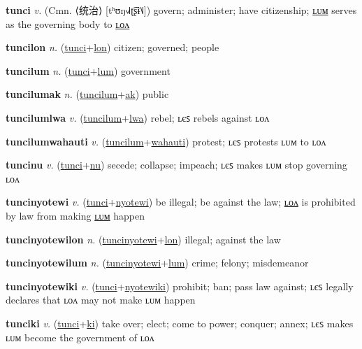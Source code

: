 \textbf{\hypertarget{tunci}{tunci}} \textit{v.} (Cmn. ⟨{\chinese{}统治}⟩ [tʰʊŋ˧˩˧ʈ͡ʂɨ˥˩])
govern; administer; have citizenship; \hyperlink{tuncilum}{ʟᴜᴍ} serves as the governing body to \hyperlink{tuncilon}{ʟᴏᴧ}

\textbf{\hypertarget{tuncilon}{tuncilon}} \textit{n.} (\hyperlink{tunci}{tunci}+\allowbreak \hyperlink{lon}{lon})
citizen; governed; people

\textbf{\hypertarget{tuncilum}{tuncilum}} \textit{n.} (\hyperlink{tunci}{tunci}+\allowbreak \hyperlink{lum}{lum})
government

\textbf{\hypertarget{tuncilumak}{tuncilumak}} \textit{n.} (\hyperlink{tuncilum}{tuncilum}+\allowbreak \hyperlink{ak}{ak})
public

\textbf{\hypertarget{tuncilumlwa}{tuncilumlwa}} \textit{v.} (\hyperlink{tuncilum}{tuncilum}+\allowbreak \hyperlink{lwa}{lwa})
rebel; ʟєꜱ rebels against ʟᴏᴧ

\textbf{\hypertarget{tuncilumwahauti}{tuncilumwahauti}} \textit{v.} (\hyperlink{tuncilum}{tuncilum}+\allowbreak \hyperlink{wahauti}{wahauti})
protest; ʟєꜱ protests ʟᴜᴍ to ʟᴏᴧ

\textbf{\hypertarget{tuncinu}{tuncinu}} \textit{v.} (\hyperlink{tunci}{tunci}+\allowbreak \hyperlink{nu}{nu})
secede; collapse; impeach; ʟєꜱ makes ʟᴜᴍ stop governing ʟᴏᴧ

\textbf{\hypertarget{tuncinyotewi}{tuncinyotewi}} \textit{v.} (\hyperlink{tunci}{tunci}+\allowbreak \hyperlink{nyotewi}{nyotewi})
be illegal; be against the law; \hyperlink{tuncinyotewilon}{ʟᴏᴧ} is prohibited by law from making \hyperlink{tuncinyotewilum}{ʟᴜᴍ} happen

\textbf{\hypertarget{tuncinyotewilon}{tuncinyotewilon}} \textit{n.} (\hyperlink{tuncinyotewi}{tuncinyotewi}+\allowbreak \hyperlink{lon}{lon})
illegal; against the law

\textbf{\hypertarget{tuncinyotewilum}{tuncinyotewilum}} \textit{n.} (\hyperlink{tuncinyotewi}{tuncinyotewi}+\allowbreak \hyperlink{lum}{lum})
crime; felony; misdemeanor

\textbf{\hypertarget{tuncinyotewiki}{tuncinyotewiki}} \textit{v.} (\hyperlink{tunci}{tunci}+\allowbreak \hyperlink{nyotewiki}{nyotewiki})
prohibit; ban; pass law against; ʟєꜱ legally declares that ʟᴏᴧ may not make ʟᴜᴍ happen

\textbf{\hypertarget{tunciki}{tunciki}} \textit{v.} (\hyperlink{tunci}{tunci}+\allowbreak \hyperlink{ki}{ki})
take over; elect; come to power; conquer; annex; ʟєꜱ makes ʟᴜᴍ become the government of ʟᴏᴧ

